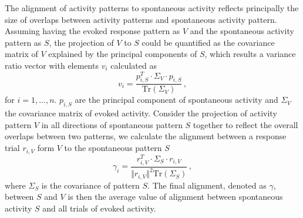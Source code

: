 \documentclass[11pt]{article}
\begin{document}
{	The alignment of activity patterns to spontaneous activity reflects principally the size of overlaps between activity patterns and spontaneous activity pattern. 
	Assuming having the evoked response pattern as $V$ and the spontaneous activity pattern as $S$, the projection of $V$ to $S$ could be quantified as the covariance matrix of $V$ explained by the principal components of $S$, which results a variance ratio vector with elements $v_i$ calculated as
		\begin{equation} \label{eq:var_explain_spont_act_sym}
			v_i = \frac{p_{i, S}^T \cdot \Sigma_V \cdot p_{i, S}}{\text{Tr}(\Sigma_V)} \, , 
		\end{equation}
	for $i = 1, ..., n$. $p_{i, S}$ are the principal component of spontaneous activity and $\Sigma_V$ the covariance matrix of evoked activity. 
	Consider the projection of activity pattern $V$ in all directions of spontaneous pattern $S$ together to reflect the overall overlaps between two patterns, we calculate the alignment between a response trial $r_{i, V}$ form $V$ to the spontaneous pattern $S$ 
		\begin{equation} \label{eq:align_to_spont_act_sym}
			\gamma_i = \frac{r^T_{i, V} \cdot \Sigma_S \cdot r_{i,V}}{\Vert r_{i, V} \Vert^2 \text{Tr}(\Sigma_S)}\, ,
		\end{equation}
	where $\Sigma_S$ is the covariance of pattern $S$. The final alignment, denoted as $\gamma$, between $S$ and $V$ is then the average value of alignment between spontaneous activity $S$ and all trials of evoked activity. 
	
}
\end{document}
